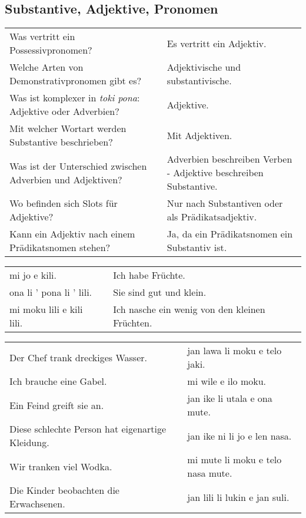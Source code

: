 \newpage
%
\subsection*{Substantive, Adjektive, Pronomen} 
\label{'adjectives'}

\begin{supertabular}{p{5,5cm}|ll}
Was vertritt ein Possessivpronomen? && Es vertritt ein Adjektiv. \\ %
Welche Arten von Demonstrativpronomen gibt es? && Adjektivische und substantivische.  \\ %
Was ist komplexer in \textit{toki pona}: Adjektive oder Adverbien? && Adjektive.  \\ %
Mit welcher Wortart werden Substantive beschrieben? && Mit Adjektiven.  \\ %
Was ist der Unterschied zwischen Adverbien und Adjektiven? && Adverbien beschreiben Verben - Adjektive beschreiben Substantive. \\ %
Wo befinden sich Slots für Adjektive? && Nur nach Substantiven oder als Prädikatsadjektiv. \\ %
Kann ein Adjektiv nach einem Prädikatsnomen stehen? && Ja, da ein Prädikatsnomen ein Substantiv ist.  \\ %
\end{supertabular}

\begin{supertabular}{p{5,5cm}|ll}
mi jo e kili.  &&  Ich habe Früchte. \\
ona li ' pona li ' lili. && Sie sind gut und klein. \\
mi moku lili e kili lili.  && Ich nasche ein wenig von den kleinen Früchten. \\
\end{supertabular}  

\begin{supertabular}{p{5,5cm}|ll}
Der Chef trank dreckiges Wasser. && jan lawa li moku e telo jaki. \\ %
Ich brauche eine Gabel. && mi wile e ilo moku. \\ %
Ein Feind greift sie an.  && jan ike li utala e ona mute. \\ %
Diese schlechte Person hat eigenartige Kleidung.  && jan ike ni li jo e len nasa. \\ %
Wir tranken viel Wodka.  && mi mute li moku e telo nasa mute. \\ %
Die Kinder beobachten die Erwachsenen.  && jan lili li lukin e jan suli. \\ %
\end{supertabular}  

